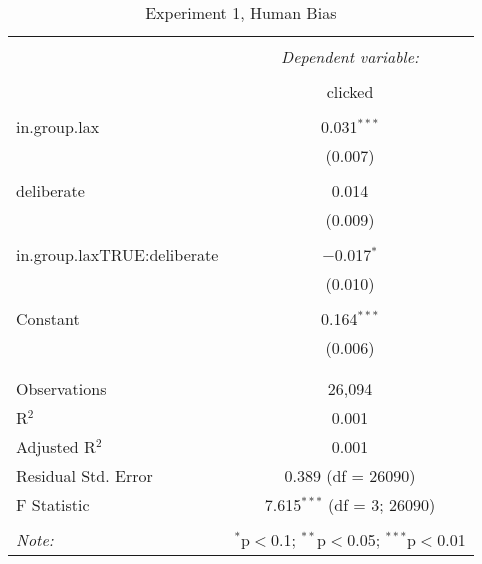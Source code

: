 
\begin{table}[!htbp] \centering 
  \caption{Experiment 1, Human Bias} 
  \label{} 
\begin{tabular}{@{\extracolsep{5pt}}lc} 
\\[-1.8ex]\hline 
\hline \\[-1.8ex] 
 & \multicolumn{1}{c}{\textit{Dependent variable:}} \\ 
\cline{2-2} 
\\[-1.8ex] & clicked \\ 
\hline \\[-1.8ex] 
 in.group.lax & 0.031$^{***}$ \\ 
  & (0.007) \\ 
  & \\ 
 deliberate & 0.014 \\ 
  & (0.009) \\ 
  & \\ 
 in.group.laxTRUE:deliberate & $-$0.017$^{*}$ \\ 
  & (0.010) \\ 
  & \\ 
 Constant & 0.164$^{***}$ \\ 
  & (0.006) \\ 
  & \\ 
\hline \\[-1.8ex] 
Observations & 26,094 \\ 
R$^{2}$ & 0.001 \\ 
Adjusted R$^{2}$ & 0.001 \\ 
Residual Std. Error & 0.389 (df = 26090) \\ 
F Statistic & 7.615$^{***}$ (df = 3; 26090) \\ 
\hline 
\hline \\[-1.8ex] 
\textit{Note:}  & \multicolumn{1}{r}{$^{*}$p$<$0.1; $^{**}$p$<$0.05; $^{***}$p$<$0.01} \\ 
\end{tabular} 
\end{table} 
